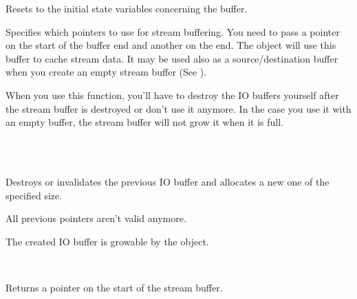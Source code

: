 

Resets to the initial state variables concerning the buffer.

\label{wxstreambuffersetbufferio}


Specifies which pointers to use for stream buffering. You need to pass a pointer on the
start of the buffer end and another on the end. The object will use this buffer
to cache stream data. It may be used also as a source/destination buffer when
you create an empty stream buffer (See ).


When you use this function, you'll have to destroy the IO buffers yourself
after the stream buffer is destroyed or don't use it anymore.
In the case you use it with an empty buffer, the stream buffer will not grow
it when it is full.


\\
\\


Destroys or invalidates the previous IO buffer and allocates a new one of the
specified size.


All previous pointers aren't valid anymore.


The created IO buffer is growable by the object.


\\



Returns a pointer on the start of the stream buffer.

